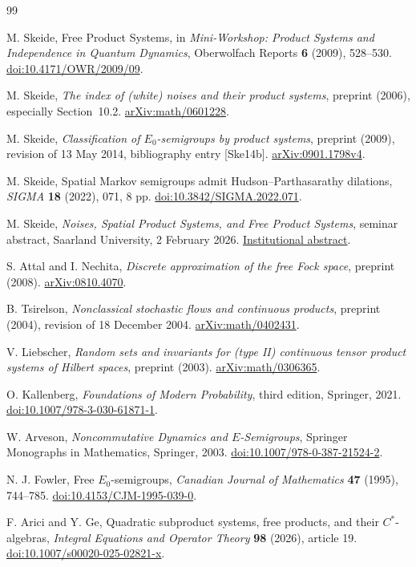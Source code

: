 \documentclass[11pt]{article}
\theoremstyle{remark}\newtheorem{remark}[theorem]{Remark}
\begin{document}
\begin{thebibliography}{99}
\raggedright
{}
M. Skeide, Free Product Systems, in \emph{Mini-Workshop: Product Systems and
Independence in Quantum Dynamics}, Oberwolfach Reports \textbf{6} (2009),
528--530. \href{https://doi.org/10.4171/OWR/2009/09}{doi:10.4171/OWR/2009/09}.

M. Skeide, \emph{The index of (white) noises and their product systems},
preprint (2006), especially Section~10.2.
\href{https://arxiv.org/abs/math/0601228}{arXiv:math/0601228}.

M. Skeide, \emph{Classification of $E_0$-semigroups by product systems},
preprint (2009), revision of 13 May 2014, bibliography entry [Ske14b].
\href{https://arxiv.org/abs/0901.1798v4}{arXiv:0901.1798v4}.

M. Skeide, Spatial Markov semigroups admit Hudson--Parthasarathy dilations,
\emph{SIGMA} \textbf{18} (2022), 071, 8 pp.
\href{https://doi.org/10.3842/SIGMA.2022.071}{doi:10.3842/SIGMA.2022.071}.

M. Skeide, \emph{Noises, Spatial Product Systems, and Free Product Systems},
seminar abstract, Saarland University, 2 February 2026.
\href{https://www.uni-saarland.de/fileadmin/upload/lehrstuhl/weber-moritz/ResearchSeminar/Abstract_Michael_Skeide_2602.pdf}{Institutional abstract}.

S. Attal and I. Nechita, \emph{Discrete approximation of the free Fock space},
preprint (2008).
\href{https://arxiv.org/abs/0810.4070}{arXiv:0810.4070}.

B. Tsirelson, \emph{Nonclassical stochastic flows and continuous products},
preprint (2004), revision of 18 December 2004.
\href{https://arxiv.org/abs/math/0402431}{arXiv:math/0402431}.

V. Liebscher, \emph{Random sets and invariants for (type II) continuous
tensor product systems of Hilbert spaces}, preprint (2003).
\href{https://arxiv.org/abs/math/0306365}{arXiv:math/0306365}.

O. Kallenberg, \emph{Foundations of Modern Probability}, third edition,
Springer, 2021. \href{https://doi.org/10.1007/978-3-030-61871-1}{doi:10.1007/978-3-030-61871-1}.

W. Arveson, \emph{Noncommutative Dynamics and $E$-Semigroups},
Springer Monographs in Mathematics, Springer, 2003.
\href{https://doi.org/10.1007/978-0-387-21524-2}{doi:10.1007/978-0-387-21524-2}.

N. J. Fowler, Free $E_0$-semigroups, \emph{Canadian Journal of Mathematics}
\textbf{47} (1995), 744--785.
\href{https://doi.org/10.4153/CJM-1995-039-0}{doi:10.4153/CJM-1995-039-0}.

F. Arici and Y. Ge, Quadratic subproduct systems, free products, and their
$C^*$-algebras, \emph{Integral Equations and Operator Theory} \textbf{98}
(2026), article 19.
\href{https://doi.org/10.1007/s00020-025-02821-x}{doi:10.1007/s00020-025-02821-x}.
\end{thebibliography}
\end{document}
